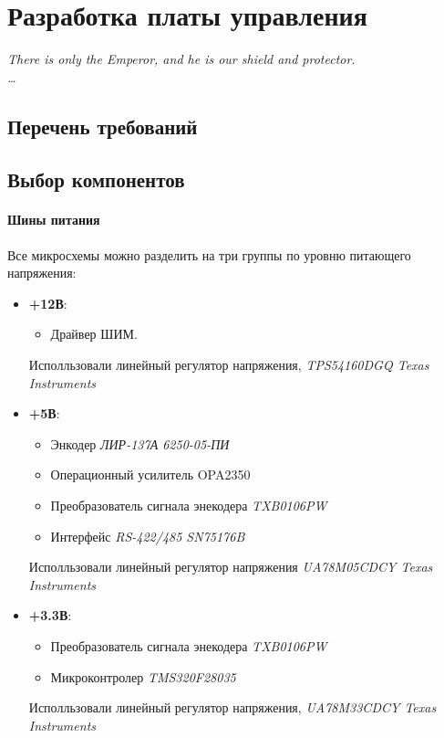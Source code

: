 \documentclass{article}
\begin{document}
\section{Разработка платы управления}
\begin{flushright}
    \itshape
    There is only the Emperor, and he is our shield and protector.\\
    \ldots
\end{flushright}
\subsection{Перечень требований}
\subsection{Выбор компонентов}
\paragraph{Шины питания}
Все микросхемы можно разделить на три группы по уровню питающего напряжения:
\begin{itemize}
    \item \textbf{+12В}:
        \begin{itemize}
            \item Драйвер ШИМ.
        \end{itemize}
        Исполльзовали линейный регулятор напряжения, \textit{TPS54160DGQ Texas Instruments}
    \item \textbf{+5В}:
        \begin{itemize}
            \item Энкодер \textit{ЛИР-137А 6250-05-ПИ}
            \item Операционный усилитель OPA2350
            \item Преобразователь сигнала энекодера \textit{TXB0106PW}
            \item Интерфейс \textit{RS-422/485 SN75176B}
        \end{itemize}
        Исполльзовали линейный регулятор напряжения \textit{UA78M05CDCY Texas Instruments}
    \item \textbf{+3.3В}:
        \begin{itemize}
            \item Преобразователь сигнала энекодера \textit{TXB0106PW}
            \item Микроконтролер \textit{TMS320F28035}
        \end{itemize}
        Исполльзовали линейный регулятор напряжения, \textit{UA78M33CDCY Texas Instruments}
\end{itemize}
\end{document}
